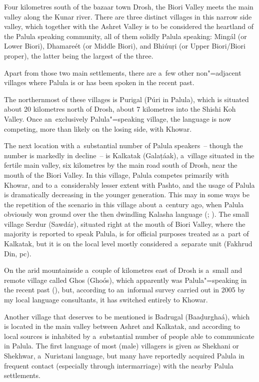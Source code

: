 Four kilometres south of the bazaar town Drosh, the Biori Valley meets the main valley along the Kunar river. There are three distinct villages in this narrow side valley, which together with the Ashret Valley is to be considered the heartland of the Palula speaking community, all of them solidly Palula speaking: Mingál (or Lower Biori), Dhamareét (or Middle Biori), and Bhiúuṛi (or Upper Biori/Biori proper), the latter being the largest of the three. 


Apart from those two main settlements, there are a~few other non"=adjacent villages where Palula is or has been spoken in the recent past.


The northernmost of these villages is Purigal (Púri in Palula), which is situated about 20 kilometres north of Drosh, about 7 kilometres into the Shishi Koh Valley. Once an~exclusively Palula"=speaking village, the language is now competing, more than likely on the losing side, with Khowar.


The next location with a~substantial number of Palula speakers~-- though the number is markedly in decline~-- is Kalkatak (Galaṭáak), a~village situated in the fertile main valley, six kilometres by the main road south of Drosh, near the mouth of the Biori Valley. In this village, Palula competes primarily with Khowar, and to a~considerably lesser extent with Pashto, and the usage of Palula is dramatically decreasing in the younger generation. This may in some ways be the repetition of the scenario in this village about a~century ago, when Palula obviously won ground over the then dwindling Kalasha language (\citealt[165]{decker1996}; \citealt[95]{cacopardo2001}). The small village Serdur (Sawdár), situated right at the mouth of Biori Valley, where the majority is reported to speak Palula, is for official purposes treated as a~part of Kalkatak, but it is on the local level mostly considered a~separate unit (Fakhrud Din, pc).


On the arid mountainside a~couple of kilometres east of Drosh is a~small and remote village called Ghos (Ghoós), which apparently was Palula"=speaking in the recent past (\citealt[75, 84]{decker1992a}), but, according to an~informal survey carried out in 2005 by my local language consultants, it has switched entirely to Khowar.


Another village that deserves to be mentioned is Badrugal (Baaḍurghaá), which is located in the main valley between Ashret and Kalkatak, and according to local sources is inhabited by a~substantial number of people able to communicate in Palula. The first language of most (male) villagers is given as Shekhani or Shekhwar, a~Nuristani language, but many have reportedly acquired Palula in frequent contact (especially through intermarriage) with the nearby Palula settlements. 


